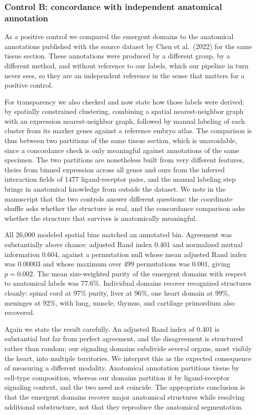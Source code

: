 \documentclass[11pt]{article}
\begin{document}
\subsubsection*{Control B: concordance with independent anatomical annotation}

As a positive control we compared the emergent domains to the anatomical annotations
published with the source dataset by Chen et al.\ (2022) for the same tissue section. These
annotations were produced by a different group, by a different method, and without reference
to our labels, which our pipeline in turn never sees, so they are an independent reference in
the sense that matters for a positive control.

For transparency we also checked and now state how those labels were derived: by spatially
constrained clustering, combining a spatial nearest-neighbor graph with an expression
nearest-neighbor graph, followed by manual labeling of each cluster from its marker genes
against a reference embryo atlas. The comparison is thus between two partitions of the same
tissue section, which is unavoidable, since a concordance check is only meaningful against
annotations of the same specimen. The two partitions are nonetheless built from very
different features, theirs from binned expression across all genes and ours from the
inferred interaction fields of 1477 ligand-receptor pairs, and the manual labeling step brings in
anatomical knowledge from outside the dataset. We note in the manuscript that the two
controls answer different questions: the coordinate shuffle asks whether the structure is
real, and the concordance comparison asks whether the structure that survives is anatomically
meaningful.

All 26{,}000 modeled spatial bins matched an annotated bin. Agreement was substantially
above chance: adjusted Rand index 0.401 and normalized mutual information 0.604, against a
permutation null whose mean adjusted Rand index was 0.00003 and whose maximum over 499
permutations was 0.001, giving $p = 0.002$. The mean size-weighted purity of the emergent
domains with respect to anatomical labels was 77.6\%. Individual domains recover recognized
structures cleanly: spinal cord at 97\% purity, liver at 96\%, one heart domain at 99\%,
meninges at 92\%, with lung, muscle, thymus, and cartilage primordium also recovered.

Again we state the result carefully. An adjusted Rand index of 0.401 is substantial but far
from perfect agreement, and the disagreement is structured rather than random: our
signaling domains subdivide several organs, most visibly the heart, into multiple
territories. We interpret this as the expected consequence of measuring a different
modality. Anatomical annotation partitions tissue by cell-type composition, whereas our
domains partition it by ligand-receptor signaling context, and the two need not coincide.
The appropriate conclusion is that the emergent domains recover major anatomical structures
while resolving additional substructure, not that they reproduce the anatomical
segmentation.
\end{document}
